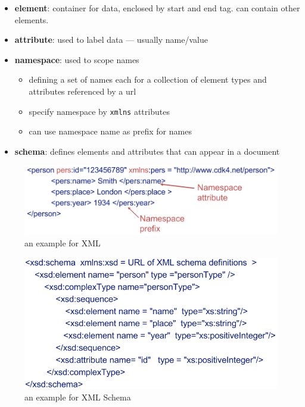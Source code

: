 \documentclass[twocolumn,landscape,10pt]{article}
\theoremstyle{definition}
\begin{document}
\begin{itemize}
    \item \textbf{element}: container for data, enclosed by start and end tag.
        can contain other elements.
    \item \textbf{attribute}: used to label data --- usually name/value
    \item \textbf{namespace}: used to scope names
        \begin{itemize}
            \item defining a set of names each for a collection of 
                element types and attributes referenced by a url 
            \item specify namespace by \texttt{xmlns} attributes
            \item can use namespace name as prefix for names
        \end{itemize} 
    \item \textbf{schema}: defines elements and attributes that can appear in a
        document
\end{itemize} 

\begin{figure}[h]
  	\includegraphics[scale=0.35]{xml.png}
  	\centering
    \caption{an example for XML}
\end{figure}

\begin{figure}[h]
  	\includegraphics[scale=0.35]{xml_schema.png}
  	\centering
    \caption{an example for XML Schema}
\end{figure}
\end{document}
